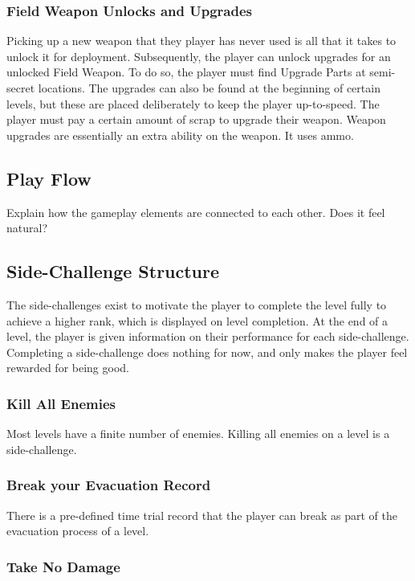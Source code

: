 \documentclass[12pt]{article}
\begin{document}
\subsubsection{Field Weapon Unlocks and Upgrades}

Picking up a new weapon that they player has never used is all that it takes to unlock it for deployment. Subsequently, the player can unlock upgrades for an unlocked Field Weapon. To do so, the player must find Upgrade Parts at semi-secret locations. The upgrades can also be found at the beginning of certain levels, but these are placed deliberately to keep the player up-to-speed. The player must pay a certain amount of scrap to upgrade their weapon. Weapon upgrades are essentially an extra ability on the weapon. It uses ammo.

\subsection{Play Flow}

Explain how the gameplay elements are connected to each other. Does it feel natural?

\subsection{Side-Challenge Structure}

The side-challenges exist to motivate the player to complete the level fully to achieve a higher rank, which is displayed on level completion. At the end of a level, the player is given information on their performance for each side-challenge. Completing a side-challenge does nothing for now, and only makes the player feel rewarded for being good. 

\subsubsection{Kill All Enemies}

Most levels have a finite number of enemies. Killing all enemies on a level is a side-challenge.

\subsubsection{Break your Evacuation Record}

There is a pre-defined time trial record that the player can break as part of the evacuation process of a level. 

\subsubsection{Take No Damage}
\end{document}
